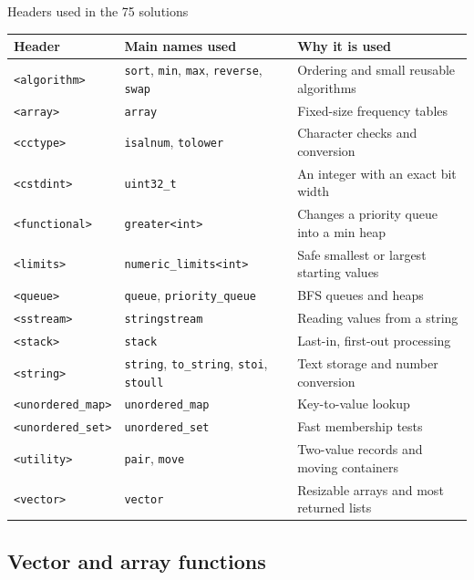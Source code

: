 \begin{revisionbox}{Headers used in the 75 solutions}
\footnotesize
\renewcommand{\arraystretch}{1.12}
\setlength{\tabcolsep}{3pt}
\begin{tabularx}{\linewidth}{@{}>{\raggedright\arraybackslash}p{3.0cm}
  >{\raggedright\arraybackslash}p{4.0cm}X@{}}
\toprule
Header & Main names used & Why it is used \\
\midrule
\texttt{<algorithm>} & \texttt{sort}, \texttt{min}, \texttt{max}, \texttt{reverse},
\texttt{swap} & Ordering and small reusable algorithms \\
\texttt{<array>} & \texttt{array} & Fixed-size frequency tables \\
\texttt{<cctype>} & \texttt{isalnum}, \texttt{tolower} & Character checks and conversion \\
\texttt{<cstdint>} & \texttt{uint32\_t} & An integer with an exact bit width \\
\texttt{<functional>} & \texttt{greater<int>} & Changes a priority queue into a min heap \\
\texttt{<limits>} & \texttt{numeric\_limits<int>} & Safe smallest or largest starting values \\
\texttt{<queue>} & \texttt{queue}, \texttt{priority\_queue} & BFS queues and heaps \\
\texttt{<sstream>} & \texttt{stringstream} & Reading values from a string \\
\texttt{<stack>} & \texttt{stack} & Last-in, first-out processing \\
\texttt{<string>} & \texttt{string}, \texttt{to\_string}, \texttt{stoi},
\texttt{stoull} & Text storage and number conversion \\
\texttt{<unordered\_map>} & \texttt{unordered\_map} & Key-to-value lookup \\
\texttt{<unordered\_set>} & \texttt{unordered\_set} & Fast membership tests \\
\texttt{<utility>} & \texttt{pair}, \texttt{move} & Two-value records and moving containers \\
\texttt{<vector>} & \texttt{vector} & Resizable arrays and most returned lists \\
\bottomrule
\end{tabularx}
\end{revisionbox}

\subsection{Vector and array functions}

